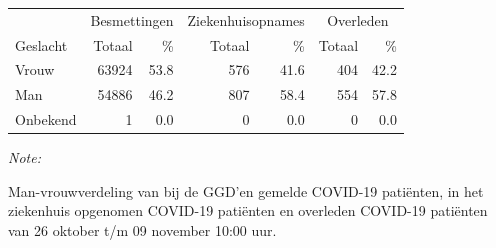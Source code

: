 \documentclass[
  english,
  man,floatsintext]{apa6}
\begin{document}
\begin{table}[H]
\centering\begingroup\fontsize{11}{13}\selectfont

\begin{threeparttable}
\begin{tabular}{lrrrrrr}
\toprule
\multicolumn{1}{c}{ } & \multicolumn{2}{c}{Besmettingen} & \multicolumn{2}{c}{Ziekenhuisopnames} & \multicolumn{2}{c}{Overleden} \\
\cmidrule(l{3pt}r{3pt}){2-3} \cmidrule(l{3pt}r{3pt}){4-5} \cmidrule(l{3pt}r{3pt}){6-7}
Geslacht & Totaal & \% & Totaal & \% & Totaal & \%\\
\midrule
Vrouw & 63924 & 53.8 & 576 & 41.6 & 404 & 42.2\\
Man & 54886 & 46.2 & 807 & 58.4 & 554 & 57.8\\
Onbekend & 1 & 0.0 & 0 & 0.0 & 0 & 0.0\\
\bottomrule
\end{tabular}
\begin{tablenotes}
\item \textit{Note: } 
\item Man-vrouwverdeling van bij de GGD’en gemelde COVID-19 patiënten, in het ziekenhuis opgenomen COVID-19 patiënten en overleden COVID-19 patiënten van 26 oktober t/m 09 november 10:00 uur.
\end{tablenotes}
\end{threeparttable}
\endgroup{}
\end{table}
\newpage
\end{document}
